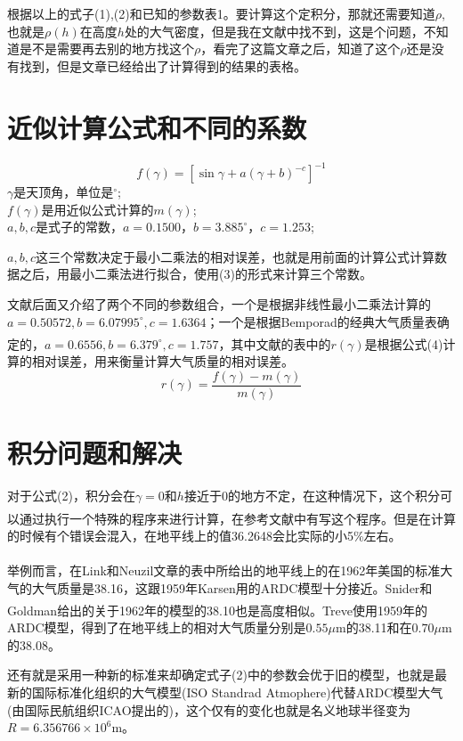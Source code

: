 \documentclass{aaa}
\newcommand{\upcite}[1]{\textsuperscript{\textsuperscript{\cite{#1}}}}
\begin{document}
根据以上的式子(1),(2)和已知的参数表1。要计算这个定积分，那就还需要知道$\rho$,也就是$\rho(h)$在高度$h$处的大气密度，但是我在文献中找不到，这是个问题，不知道是不是需要再去别的地方找这个$\rho$，看完了这篇文章之后，知道了这个$\rho$还是没有找到，但是文章已经给出了计算得到的结果的表格。
\section{近似计算公式和不同的系数}
\begin{equation}
	f(\gamma)=[\sin \gamma+a(\gamma+b)^{-c}]^{-1}
\end{equation}
$\gamma$是天顶角，单位是$^\circ$;\\
$f(\gamma)$是用近似公式计算的$m(\gamma)$;\\
$a,b,c$是式子的常数，$a=0.1500$，$b=3.885^{\circ}$，$c=1.253$;

$a,b,c$这三个常数决定于最小二乘法的相对误差，也就是用前面的计算公式计算数据之后，用最小二乘法进行拟合，使用(3)的形式来计算三个常数。

文献后面又介绍了两个不同的参数组合，一个是根据非线性最小二乘法计算的$a=0.50572,b=6.07995^{\circ},c=1.6364$；一个是根据Bemporad的经典大气质量表确定的，$a=0.6556,b=6.379^{\circ},c=1.757$\upcite{bib:one}，其中文献的表中的$r(\gamma)$是根据公式(4)计算的相对误差，用来衡量计算大气质量的相对误差。
\begin{equation}
	r(\gamma)=\frac{f(\gamma)-m(\gamma)}{m(\gamma)}
\end{equation}
\section{积分问题和解决}
对于公式(2)，积分会在$\gamma=0$和$h$接近于0的地方不定，在这种情况下，这个积分可以通过执行一个特殊的程序来进行计算，在参考文献\upcite{bib:one}中有写这个程序。但是在计算的时候有个错误会混入，在地平线上的值36.2648会比实际的小5\%左右。

举例而言，在Link和Neuzil\upcite{bib:three}文章的表中所给出的地平线上的在1962年美国的标准大气的大气质量是38.16，这跟1959年Karsen用的ARDC模型十分接近。Snider和Goldman\upcite{bib:four}给出的关于1962年的模型的38.10也是高度相似。Treve\upcite{bib:five}使用1959年的ARDC模型，得到了在地平线上的相对大气质量分别是$0.55\mu$m的38.11和在$0.70\mu$m的38.08。

还有就是采用一种新的标准来却确定式子(2)中的参数会优于旧的模型，也就是最新的国际标准化组织的大气模型(ISO Standrad Atmophere)代替ARDC模型大气(由国际民航组织ICAO提出的)，这个仅有的变化也就是名义地球半径变为$R=6.356766\times10^{6}$m。
\end{document}
